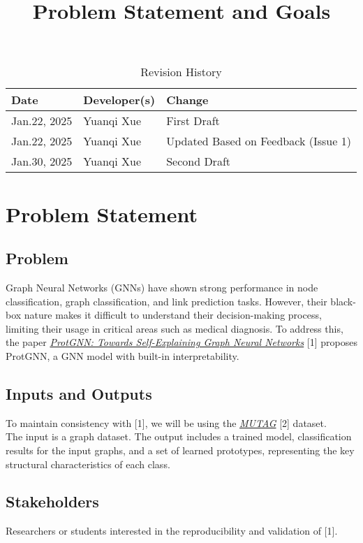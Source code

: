 \documentclass{article}
\title{Problem Statement and Goals}
\author{\authname}
\date{}
\begin{document}
\setlength{\parindent}{0pt}

\maketitle

\begin{table}[hp]
\caption{Revision History} \label{TblRevisionHistory}
\begin{tabularx}{\textwidth}{llX}
\toprule
\textbf{Date} & \textbf{Developer(s)} & \textbf{Change}\\
\midrule
Jan.22, 2025 & Yuanqi Xue & First Draft\\
Jan.22, 2025 & Yuanqi Xue & Updated Based on Feedback (Issue 1)\\
Jan.30, 2025 & Yuanqi Xue & Second Draft\\
\bottomrule
\end{tabularx}
\end{table}

\section{Problem Statement}
\subsection{Problem}
Graph Neural Networks (GNNs) have shown strong performance in node classification, graph classification, and link prediction tasks. However, their black-box nature makes it difficult to understand their decision-making process, limiting their usage in critical areas such as medical diagnosis. To address this, the paper \href{https://ojs.aaai.org/index.php/AAAI/article/view/20898}{\textit{ProtGNN: Towards Self-Explaining Graph Neural Networks}} [1] proposes ProtGNN, a GNN model with built-in interpretability.
 

\subsection{Inputs and Outputs}
To maintain consistency with [1], we will be using the \href{https://pubmed.ncbi.nlm.nih.gov/1995902/}{\textit{MUTAG}} [2] dataset.\\

The input is a graph dataset. The output includes a trained model, classification results for the input graphs, and a set of learned prototypes, representing the key structural characteristics of each class.


\subsection{Stakeholders}
Researchers or students interested in the reproducibility and validation of [1].
\end{document}
